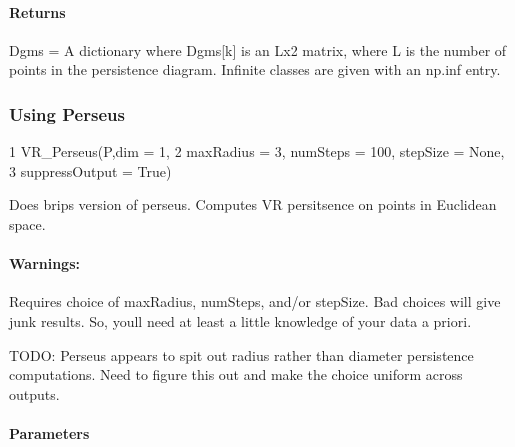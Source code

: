 \paragraph*{Returns}


\begin{DoxyItemize}
\item Dgms = A dictionary where Dgms\mbox{[}k\mbox{]} is an Lx2 matrix, where L is the number of points in the persistence diagram. Infinite classes are given with an np.\+inf entry.
\end{DoxyItemize}

\subsubsection*{Using Perseus}


\begin{DoxyCode}
1 VR\_Perseus(P,dim = 1, 
2             maxRadius = 3, numSteps = 100, stepSize = None,
3             suppressOutput = True)
\end{DoxyCode}


Does brips version of perseus. Computes VR persitsence on points in Euclidean space.

\paragraph*{Warnings\+:}


\begin{DoxyEnumerate}
\item Requires choice of max\+Radius, num\+Steps, and/or step\+Size. Bad choices will give junk results. So, you\textquotesingle{}ll need at least a little knowledge of your data a priori.
\item T\+O\+DO\+: Perseus appears to spit out radius rather than diameter persistence computations. Need to figure this out and make the choice uniform across outputs.
\end{DoxyEnumerate}

\paragraph*{Parameters}


